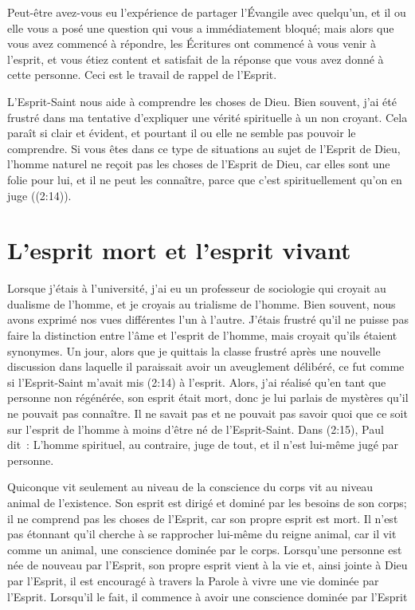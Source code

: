 Peut-être avez-vous eu l'expérience de partager l'Évangile avec quelqu'un,
 et il ou elle vous a posé une question qui vous a immédiatement bloqué;
 mais alors que vous avez commencé à répondre, les Écritures ont commencé
 à vous venir à l'esprit, et vous étiez content et satisfait de la réponse
 que vous avez donné à cette personne. Ceci est le travail de rappel de l'Esprit.

L'Esprit-Saint nous aide à comprendre les choses de Dieu.
 Bien souvent, j'ai été frustré dans ma tentative d'expliquer
 une vérité spirituelle à un non croyant.
 Cela paraît si clair et évident, et pourtant il ou elle ne semble pas
 pouvoir le comprendre.
 Si vous êtes dans ce type de situations au sujet de l'Esprit de Dieu,
 l'homme naturel \og ne reçoit pas les choses de l'Esprit de Dieu,
 car elles sont une folie pour lui, et il ne peut les connaître, 
 parce que c'est spirituellement qu'on en juge \fg{}
 ((2:14)).


\section*{L'esprit mort et l'esprit vivant}

Lorsque j'étais à l'université, j'ai eu un professeur de sociologie
 qui croyait au dualisme de l'homme, et je croyais au trialisme de l'homme.
 Bien souvent, nous avons exprimé nos vues différentes l'un à l'autre.
 J'étais frustré qu'il ne puisse pas faire la distinction entre l'âme
 et l'esprit de l'homme, mais croyait qu'ils étaient synonymes.
 Un jour, alors que je quittais la classe frustré
 après une nouvelle discussion dans laquelle il paraissait
 avoir un aveuglement délibéré, ce fut comme si l'Esprit-Saint
 m'avait mis (2:14) à l'esprit.
 Alors, j'ai réalisé qu'en tant que personne non régénérée,
 son esprit était mort, donc je lui parlais de mystères qu'il ne pouvait
 pas connaître.
 Il ne savait pas et ne pouvait pas savoir quoi que ce soit sur l'esprit
 de l'homme à moins d'être né de l'Esprit-Saint.
 Dans (2:15), Paul dit~:
 \og L'homme spirituel, au contraire, juge de tout,
 et il n'est lui-même jugé par personne. \fg{}

Quiconque vit seulement au niveau de la conscience du corps
 vit au niveau animal de l'existence.
 Son esprit est dirigé et dominé par les besoins de son corps;
 il ne comprend pas les choses de l'Esprit, car son propre esprit est mort.
 Il n'est pas étonnant qu'il cherche à se rapprocher lui-même
 du reigne animal, car il vit comme un animal,
 une conscience dominée par le corps.
 Lorsqu'une personne est née de nouveau par l'Esprit,
 son propre esprit vient à la vie et, ainsi jointe à Dieu par l'Esprit,
 il est encouragé à travers la Parole à vivre une vie dominée par l'Esprit.
 Lorsqu'il le fait, il commence à avoir une conscience dominée par l'Esprit



